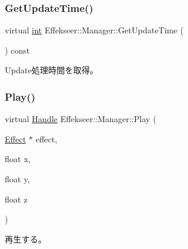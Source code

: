 \subsubsection{\texorpdfstring{Get\+Update\+Time()}{GetUpdateTime()}}
{\footnotesize\ttfamily virtual \mbox{\hyperlink{namespace_effekseer_ace0abf7c2e6947e519ebe8b54cbcc30a}{int}} Effekseer\+::\+Manager\+::\+Get\+Update\+Time (\begin{DoxyParamCaption}{ }\end{DoxyParamCaption}) const\hspace{0.3cm}{\ttfamily [pure virtual]}}



Update処理時間を取得。 

\mbox{\label{class_effekseer_1_1_manager_a5ea3211a3670843061238976dda54a4f}} 
\subsubsection{\texorpdfstring{Play()}{Play()}}
{\footnotesize\ttfamily virtual \mbox{\hyperlink{namespace_effekseer_afba58b8d812da862190e9bbfc040824a}{Handle}} Effekseer\+::\+Manager\+::\+Play (\begin{DoxyParamCaption}\item[{\mbox{\hyperlink{class_effekseer_1_1_effect}{Effect}} $\ast$}]{effect,  }\item[{float}]{x,  }\item[{float}]{y,  }\item[{float}]{z }\end{DoxyParamCaption})\hspace{0.3cm}{\ttfamily [pure virtual]}}



再生する。 


